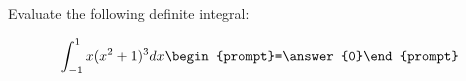 \documentclass{ximera}
\author{Jim Talamo}
\begin{document}
\begin{exercise}
Evaluate the following definite integral:

\[
\int_{-1}^{1} x(x^2+1)^3 dx 
\begin{prompt}=\answer{0}\end{prompt}
\]
\end{exercise}
\end{document}
